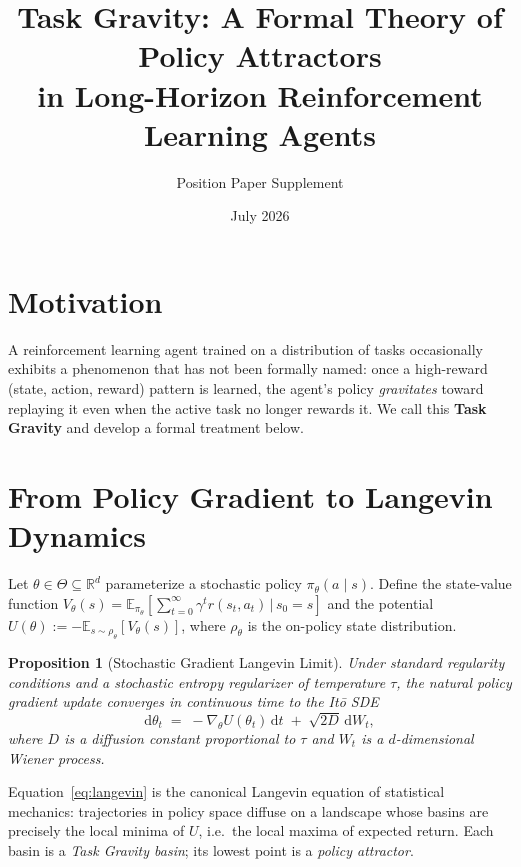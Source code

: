 \documentclass[10pt]{article}
\title{\textbf{Task Gravity: A Formal Theory of Policy Attractors\\
in Long-Horizon Reinforcement Learning Agents}}
\author{Position Paper Supplement}
\date{July 2026}
\newtheorem{proposition}{Proposition}
\begin{document}
\maketitle

\section{Motivation}

A reinforcement learning agent trained on a distribution of tasks
occasionally exhibits a phenomenon that has not been formally named:
once a high-reward (state, action, reward) pattern is learned, the
agent's policy \emph{gravitates} toward replaying it even when the
active task no longer rewards it. We call this \textbf{Task Gravity}
and develop a formal treatment below.

\section{From Policy Gradient to Langevin Dynamics}

Let $\theta \in \Theta \subseteq \mathbb{R}^d$ parameterize a stochastic
policy $\pi_\theta(a \mid s)$. Define the state-value function
$V_\theta(s) = \mathbb{E}_{\pi_\theta}\!\left[\sum_{t=0}^{\infty}
\gamma^t r(s_t, a_t)\,\big|\, s_0 = s\right]$ and the potential
$U(\theta) := -\mathbb{E}_{s \sim \rho_\theta}\!\left[V_\theta(s)\right]$,
where $\rho_\theta$ is the on-policy state distribution.

\begin{proposition}[Stochastic Gradient Langevin Limit]
Under standard regularity conditions and a stochastic entropy
regularizer of temperature $\tau$, the natural policy gradient update
converges in continuous time to the It\=o SDE
\begin{equation}\label{eq:langevin}
  \mathrm{d}\theta_t \;=\; -\nabla_\theta U(\theta_t)\,\mathrm{d}t
  \;+\; \sqrt{2D}\,\mathrm{d}W_t,
\end{equation}
where $D$ is a diffusion constant proportional to $\tau$ and
$W_t$ is a $d$-dimensional Wiener process.
\end{proposition}

\noindent
Equation~\eqref{eq:langevin} is the canonical Langevin equation of
statistical mechanics: trajectories in policy space diffuse on a
landscape whose basins are precisely the local minima of $U$, i.e.\
the local maxima of expected return. Each basin is a
\emph{Task Gravity basin}; its lowest point is a \emph{policy attractor}.
\end{document}

